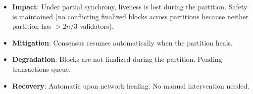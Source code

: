 \begin{itemize}[leftmargin=2em]
  \item \textbf{Impact}: Under partial synchrony, liveness is lost during the partition.
        Safety is maintained (no conflicting finalized blocks across partitions because
        neither partition has $> 2n/3$ validators).
  \item \textbf{Mitigation}: Consensus resumes automatically when the partition heals.
  \item \textbf{Degradation}: Blocks are not finalized during the partition. Pending
        transactions queue.
  \item \textbf{Recovery}: Automatic upon network healing. No manual intervention needed.
\end{itemize}

